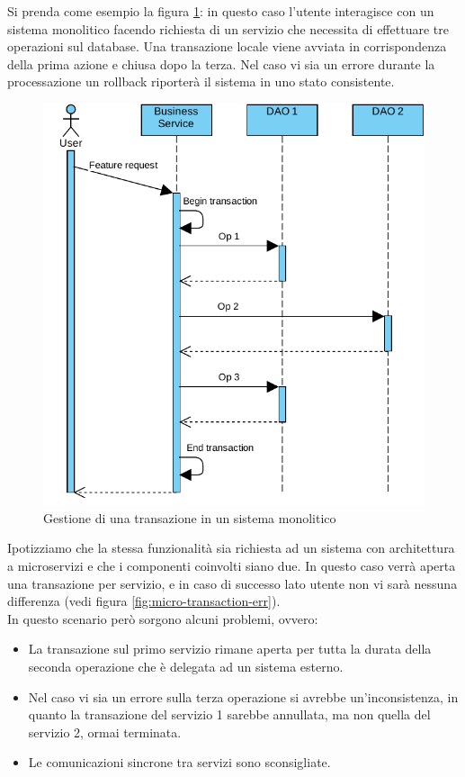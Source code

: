 Si prenda come esempio la figura \ref{fig:mono-transaction}: in questo caso l'utente interagisce con un sistema monolitico facendo richiesta di un servizio che necessita di effettuare tre operazioni sul database.
Una transazione locale viene avviata in corrispondenza della prima azione e chiusa dopo la terza.
Nel caso vi sia un errore durante la processazione un rollback riporterà il sistema in uno stato consistente.

\begin{figure}[h]
	\centering
	\includegraphics[width=\textwidth]{img/monolithic-transaction}
	\caption{Gestione di una transazione in un sistema monolitico}
	\label{fig:mono-transaction}
\end{figure}

Ipotizziamo che la stessa funzionalità sia richiesta ad un sistema con architettura a microservizi e che i componenti coinvolti siano due.
In questo caso verrà aperta una transazione per servizio, e in caso di successo lato utente non vi sarà nessuna differenza (vedi figura \ref{fig:micro-transaction-err}).\\
In questo scenario però sorgono alcuni problemi, ovvero:
\begin{itemize}
	\item La transazione sul primo servizio rimane aperta per tutta la durata della seconda operazione che è delegata ad un sistema esterno.
	\item Nel caso vi sia un errore sulla terza operazione si avrebbe un'inconsistenza, in quanto la transazione del servizio 1 sarebbe annullata, ma non quella del servizio 2, ormai terminata.
	\item Le comunicazioni sincrone tra servizi sono sconsigliate.
\end{itemize}

